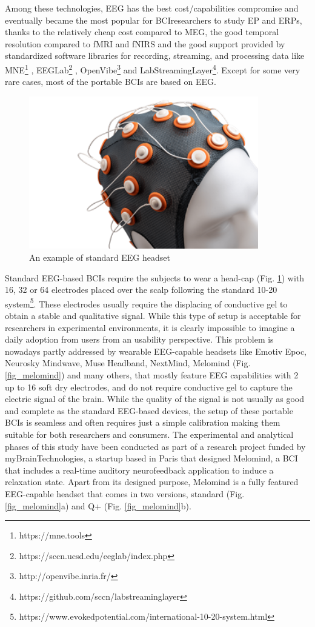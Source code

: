 Among these technologies, \ac{EEG} has the best cost/capabilities compromise and eventually became the most popular for \ac{BCI}researchers to study \ac{EP} and \ac{ERPs}, thanks to the relatively cheap cost compared to \ac{MEG}, the good temporal resolution compared to \ac{fMRI} and \ac{fNIRS} and the good support provided by standardized software libraries for recording, streaming, and processing data like MNE\footnote{https://mne.tools} , EEGLab\footnote{https://sccn.ucsd.edu/eeglab/index.php} , OpenVibe\footnote{http://openvibe.inria.fr/}  and LabStreamingLayer\footnote{https://github.com/sccn/labstreaminglayer}. Except for some very rare cases, most of the portable \ac{BCIs} are based on \ac{EEG}.

\begin{figure}[h]
\includegraphics[width=10cm]{img/background/eeg_headcap.png}
\centering
\caption{An example of standard EEG headset}\label{fig_eeg_headcap}
\end{figure}

Standard EEG-based \ac{BCIs} require the subjects to wear a head-cap (Fig. \ref{fig_eeg_headcap}) with 16, 32 or 64 electrodes placed over the scalp following the standard 10-20 system\footnote{https://www.evokedpotential.com/international-10-20-system.html}. These electrodes usually require the displacing of conductive gel to obtain a stable and qualitative signal. While this type of setup is acceptable for researchers in experimental environments, it is clearly impossible to imagine a daily adoption from users from an usability perspective. This problem is nowadays partly addressed by wearable EEG-capable headsets like Emotiv Epoc, Neurosky Mindwave, Muse Headband, NextMind, Melomind (Fig. \ref{fig_melomind}) and many others, that mostly feature EEG capabilities with 2 up to 16 soft dry electrodes, and do not require conductive gel to capture the electric signal of the brain. While the quality of the signal is not usually as good and complete as the standard EEG-based devices, the setup of these portable \ac{BCIs} is seamless and often requires just a simple calibration making them suitable for both researchers and consumers. The experimental and analytical phases of this study have been conducted as part of a research project funded by myBrainTechnologies, a startup based in Paris that designed Melomind, a \ac{BCI} that includes a real-time auditory neurofeedback application to induce a relaxation state. Apart from its designed purpose, Melomind is a fully featured EEG-capable headset that comes in two versions, standard (Fig. \ref{fig_melomind}a) and Q+ (Fig. \ref{fig_melomind}b). 

